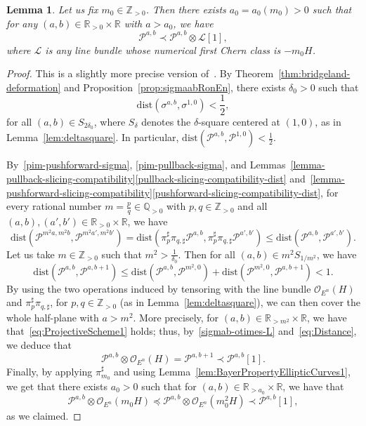 \documentclass[11pt, reqno]{amsart}
\numberwithin{equation}{section}
\theoremstyle{plain}
\newtheorem{lemma}[theorem]{Lemma}
\theoremstyle{remark}
\theoremstyle{definition}
\theoremstyle{italicsname}
\newcommand{\cO}{\mathcal{O}}
\newcommand{\cL}{\mathcal{L}}
\newcommand{\cP}{\mathscr{P}}
\def\QQ{\ensuremath{\mathbb{Q}}}
\def\RR{\ensuremath{\mathbb{R}}}
\def\ZZ{\ensuremath{\mathbb{Z}}}
\begin{document}
\begin{lemma}\label{lem:BayerPropertyEllipticCurves2}
Let us fix $m_0\in\ZZ_{>0}$.
Then there exists $a_0=a_0(m_0)>0$ such that for any $(a,b)\in\RR_{>0}\times\RR$ with $a>a_0$, we have
\begin{equation*}\label{eq:BayerPropertyEllipticCurves2}
    \cP^{a,b}\prec\cP^{a,b}\otimes\cL[1],
\end{equation*}
where $\cL$ is any line bundle whose numerical first Chern class is $-m_0H$.
\end{lemma}

\begin{proof}
This is a slightly more precise version of~\cite[Proposition 5.4]{chunyi-stability}.
By Theorem~\ref{thm:bridgeland-deformation} and Proposition~\ref{prop:sigmaabRonEn}, there exists $\delta_0>0$ such that
\[
\mathrm{dist}(\sigma^{a,b},\sigma^{1,0})<\frac 12,
\]
for all $(a,b)\in S_{2\delta_0}$, where $S_\delta$ denotes the $\delta$-square centered at $(1,0)$, as in Lemma~\ref{lem:deltasquare}.
In particular, $\mathrm{dist}(\cP^{a,b},\cP^{1,0})<\frac 12$.

By~\eqref{pim-pushforward-sigma}, \eqref{pim-pullback-sigma}, and Lemmas~\ref{lemma-pullback-slicing-compatibility}\ref{pullback-slicing-compatibility-dist} and~\ref{lemma-pushforward-slicing-compatibility}\ref{pushforward-slicing-compatibility-dist}, for every rational number $m=\frac{p}{q}\in\QQ_{>0}$ with $p,q\in\ZZ_{>0}$ and all $(a,b),(a',b')\in\RR_{>0}\times\RR$, we have 
\[
\mathrm{dist}(\cP^{m^2a,m^2b},\cP^{m^2a',m^2b'})=\mathrm{dist}(\pi^\sharp_{p} \pi_{q,\sharp}\cP^{a,b},\pi^\sharp_{p} \pi_{q,\sharp}\cP^{a',b'})\leq\mathrm{dist}(\cP^{a,b},\cP^{a',b'}). 
\]
Let us take $m\in\ZZ_{>0}$ such that $m^2>\frac{1}{\delta_0}$. 
Then for all $(a,b)\in m^2S_{1/m^2}$, we have
\begin{equation}\label{eq:ProjectiveScheme1}
\mathrm{dist}(\cP^{a,b},\cP^{a,b+1})\leq\mathrm{dist}(\cP^{a,b},\cP^{m^2,0})+\mathrm{dist}(\cP^{m^2,0},\cP^{a,b+1})<1.    
\end{equation}
By using the two operations induced by tensoring with the line bundle $\cO_{E^n}(H)$ and $\pi^\sharp_{p} \pi_{q,\sharp}$, for $p,q\in\ZZ_{>0}$ (as in Lemma~\ref{lem:deltasquare}), we can then cover the whole half-plane with $a>m^2$.
More precisely, for $(a,b)\in\RR_{>m^2}\times\RR$, we have that~\eqref{eq:ProjectiveScheme1} holds; thus, by~\eqref{sigmab-otimes-L} and~\eqref{eq:Distance}, we deduce that
\[
\cP^{a,b}\otimes\cO_{E^n}(H)=\cP^{a,b+1}\prec\cP^{a,b}[1].
\]
Finally, by applying $\pi_{m_0}^\sharp$ and using Lemma~\ref{lem:BayerPropertyEllipticCurves1}, we get that there exists $a_0>0$ such that for $(a,b)\in\RR_{>a_0}\times\RR$, we have that
\[
\cP^{a,b}\otimes\cO_{E^n}(m_0H)\preceq\cP^{a,b}\otimes\cO_{E^n}(m^2_0H)\prec\cP^{a,b}[1],
\]
as we claimed.
\end{proof}
\end{document}
